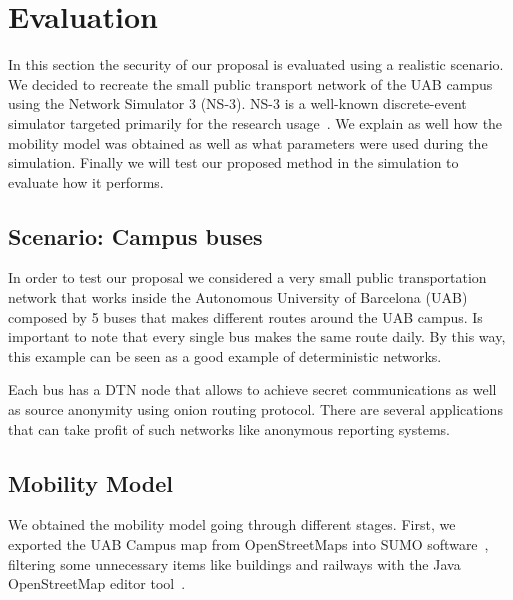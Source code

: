 \section{Evaluation}\label{sec:evaluation}


In this section the security of our proposal is evaluated using a realistic scenario. We decided to recreate the small public transport network of the UAB campus using the Network Simulator 3 (NS-3). NS-3 is a well-known discrete-event simulator targeted primarily for the research usage~\cite{ns-3-webpage}. We explain as well how the mobility model was obtained as well as what parameters were used during the simulation. Finally we will test our proposed method in the simulation to evaluate how it performs.

\subsection{Scenario: Campus buses}


In order to test our proposal we considered a very small public transportation network that works inside the Autonomous University of Barcelona (UAB) composed by 5 buses that makes different routes around the UAB campus. Is important to note that every single bus makes the same route daily. By this way, this example can be seen as a good example of deterministic networks.

Each bus has a DTN node that allows to achieve secret communications as well as source anonymity using onion routing protocol. There are several applications that can take profit of such networks like anonymous reporting systems.

\subsection{Mobility Model}


We obtained the mobility model going through different stages. First, we exported the UAB Campus map from OpenStreetMaps into SUMO software~\cite{sumo}, filtering some unnecessary items like buildings and railways with the Java OpenStreetMap editor tool~\cite{josm}.

